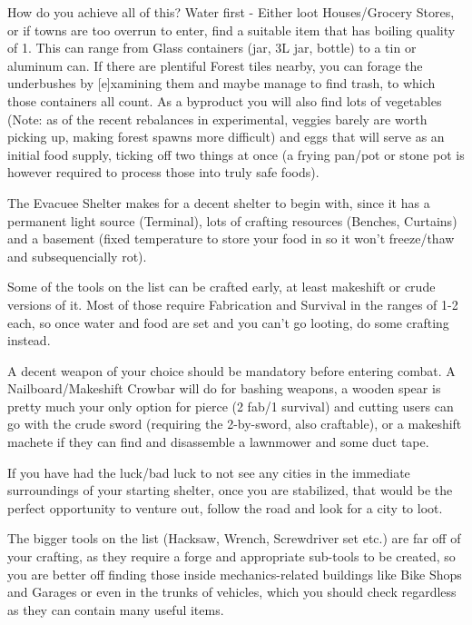 \documentclass[11pt]{report}
\begin{document}
How do you achieve all of this? Water first - Either loot Houses/Grocery Stores, or if towns are too overrun to enter, find a suitable item that has boiling quality of 1. This can range from Glass containers (jar, 3L jar, bottle) to a tin or aluminum can. If there are plentiful Forest tiles nearby, you can forage the underbushes by [e]xamining them and maybe manage to find trash, to which those containers all count. As a byproduct you will also find lots of vegetables (Note: as of the recent rebalances in experimental, veggies barely are worth picking up, making forest spawns more difficult) and eggs that will serve as an initial food supply, ticking off two things at once (a frying pan/pot or stone pot is however required to process those into truly safe foods).

The Evacuee Shelter makes for a decent shelter to begin with, since it has a permanent light source (Terminal), lots of crafting resources (Benches, Curtains) and a basement (fixed temperature to store your food in so it won't freeze/thaw and subsequencially rot).

Some of the tools on the list can be crafted early, at least makeshift or crude versions of it. Most of those require Fabrication and Survival in the ranges of 1-2 each, so once water and food are set and you can't go looting, do some crafting instead.

A decent weapon of your choice should be mandatory before entering combat. A Nailboard/Makeshift Crowbar will do for bashing weapons, a wooden spear is pretty much your only option for pierce (2 fab/1 survival) and cutting users can go with the crude sword (requiring the 2-by-sword, also craftable), or a makeshift machete if they can find and disassemble a lawnmower and some duct tape.

If you have had the luck/bad luck to not see any cities in the immediate surroundings of your starting shelter, once you are stabilized, that would be the perfect opportunity to venture out, follow the road and look for a city to loot.

The bigger tools on the list (Hacksaw, Wrench, Screwdriver set etc.) are far off of your crafting, as they require a forge and appropriate sub-tools to be created, so you are better off finding those inside mechanics-related buildings like Bike Shops and Garages or even in the trunks of vehicles, which you should check regardless as they can contain many useful items.
\end{document}
